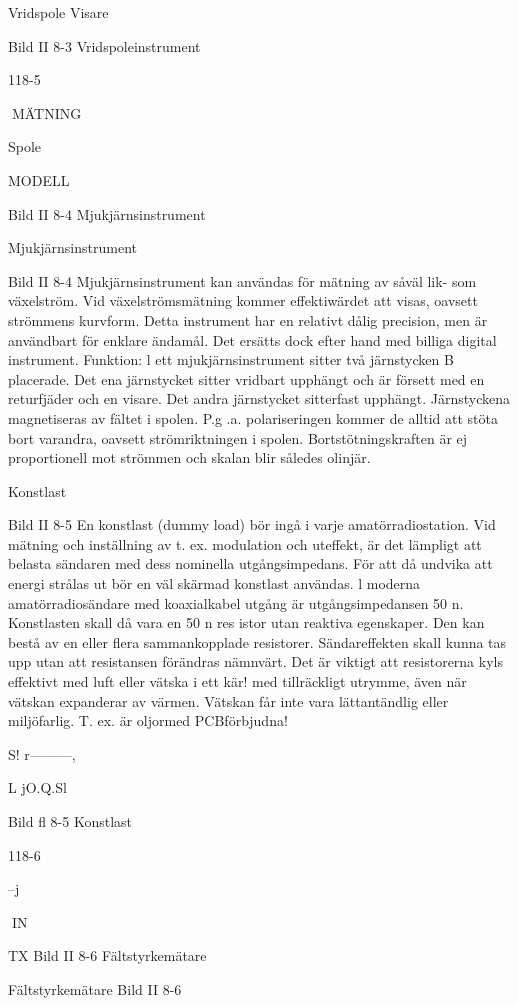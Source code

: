 Vridspole
Visare\

Bild II 8-3 Vridspoleinstrument

118-5

MÄTNING

Spole

MODELL

Bild II 8-4 Mjukjärnsinstrument

Mjukjärnsinstrument

Bild II 8-4
Mjukjärnsinstrument kan användas för mätning av såväl lik- som växelström. Vid växelströmsmätning kommer effektiwärdet att
visas, oavsett strömmens kurvform.
Detta instrument har en relativt dålig precision, men är användbart för enklare ändamål. Det ersätts dock efter hand med billiga
digital instrument.
Funktion: l ett mjukjärnsinstrument sitter
två järnstycken B placerade. Det ena järnstycket sitter vridbart upphängt och är försett
med en returfjäder och en visare. Det andra
järnstycket sitterfast upphängt. Järnstyckena
magnetiseras av fältet i spolen. P.g .a. polariseringen kommer de alltid att stöta bort
varandra, oavsett strömriktningen i spolen.
Bortstötningskraften är ej proportionell mot
strömmen och skalan blir således olinjär.

Konstlast

Bild II 8-5
En konstlast (dummy load) bör ingå i varje
amatörradiostation. Vid mätning och inställning av t. ex. modulation och uteffekt, är det
lämpligt att belasta sändaren med dess nominella utgångsimpedans. För att då undvika att energi strålas ut bör en väl skärmad
konstlast användas.
l moderna amatörradiosändare med koaxialkabel utgång är utgångsimpedansen 50
n. Konstlasten skall då vara en 50 n res istor
utan reaktiva egenskaper. Den kan bestå av
en eller flera sammankopplade resistorer.
Sändareffekten skall kunna tas upp utan
att resistansen förändras nämnvärt. Det är
viktigt att resistorerna kyls effektivt med luft
eller vätska i ett kär! med tillräckligt utrymme, även när vätskan expanderar av värmen. Vätskan får inte vara lättantändlig eller
miljöfarlig. T. ex. är oljormed PCBförbjudna!

S!
r---------,

L  jO.Q.Sl

Bild fl 8-5 Konstlast

118-6

--j

IN

TX
Bild II 8-6 Fältstyrkemätare

Fältstyrkemätare
Bild II 8-6

